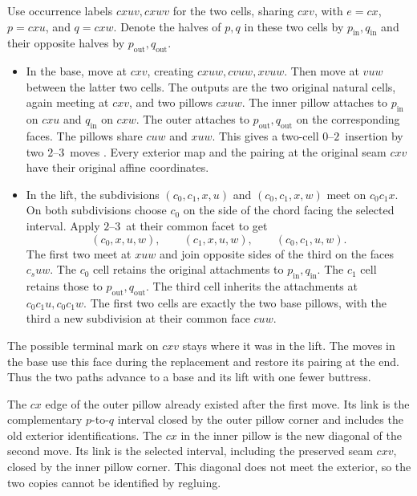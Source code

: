 \documentclass[11pt]{amsart}
\newcommand{\moveup}{\(2\)--\(3\)}
\newcommand{\zerototwo}{\(0\)--\(2\)}
\begin{document}
Use occurrence labels \(cxuv,cxwv\) for the two cells, sharing \(cxv\),
with \(e=cx\), \(p=cxu\), and \(q=cxw\). Denote the halves of \(p,q\)
in these two cells by \(p_{\mathrm{in}},q_{\mathrm{in}}\) and their
opposite halves by \(p_{\mathrm{out}},q_{\mathrm{out}}\).
\begin{itemize}
\item In the base, move at \(cxv\), creating \(cxuw,cvuw,xvuw\).
  Then move at \(vuw\) between the latter two cells. The outputs are
  the two original natural cells, again meeting at \(cxv\), and two
  pillows \(cxuw\). The inner pillow attaches to \(p_{\mathrm{in}}\)
  on \(cxu\) and \(q_{\mathrm{in}}\) on \(cxw\). The outer attaches to
  \(p_{\mathrm{out}},q_{\mathrm{out}}\) on the corresponding faces.
  The pillows share \(cuw\) and \(xuw\). This gives a two-cell
  \zerototwo\ insertion by two \moveup\ moves \cite[Fig.~28]{amendola}.
  Every exterior map and the pairing at the original seam \(cxv\)
  have their original affine coordinates.
\item In the lift, the subdivisions \((c_0,c_1,x,u)\) and
  \((c_0,c_1,x,w)\) meet on \(c_0c_1x\). On both subdivisions choose
  \(c_0\) on the side of the chord facing the selected interval. Apply
  \moveup\ at their common facet to get
  \[
          (c_0,x,u,w),\qquad(c_1,x,u,w),\qquad(c_0,c_1,u,w).
  \]
  The first two meet at \(xuw\) and join opposite sides of the
  third on the faces \(c_suw\). The \(c_0\) cell retains the original
  attachments to \(p_{\mathrm{in}},q_{\mathrm{in}}\). The \(c_1\) cell
  retains those to \(p_{\mathrm{out}},q_{\mathrm{out}}\). The third
  cell inherits the attachments at \(c_0c_1u,c_0c_1w\).
  The first two cells are exactly the two base pillows, with the
  third a new subdivision at their common face \(cuw\).
\end{itemize}
The possible terminal mark on \(cxv\) stays where it was in the lift.
The moves in the base use this face during the replacement and restore
its pairing at the end. Thus the two paths advance to a base and its
lift with one fewer buttress.

The \(cx\) edge of the outer pillow already existed after the first
move. Its link is the complementary \(p\)-to-\(q\) interval closed by
the outer pillow corner and includes the old exterior identifications.
The \(cx\) in the inner pillow is the new diagonal of the second move.
Its link is the selected interval, including the preserved seam \(cxv\),
closed by the inner pillow corner. This diagonal does not meet the
exterior, so the two copies cannot be identified by regluing.
\end{document}
